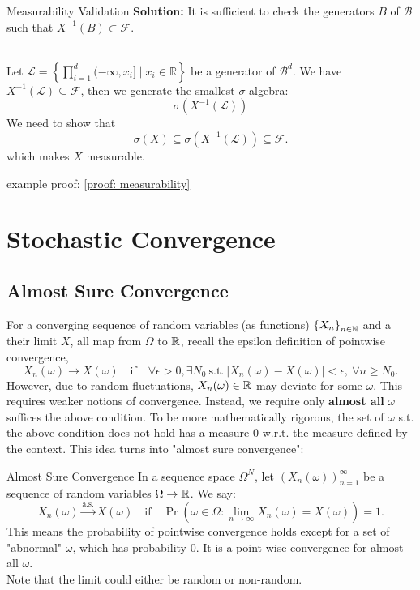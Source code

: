 \begin{thm}{Measurability Validation}
\textbf{Solution:} It is sufficient to check the generators \( B \) of $\mathscr{B}$ such that \( X^{-1}(B)\subset \mathscr{F}\).\\
\end{thm}

\begin{eg}\\
 Let \( \mathcal{L} = \left\{ \prod_{i=1}^d (-\infty, x_i] \mid x_i \in \mathbb{R} \right\} \) be a generator of \( \mathscr{B}^d \).
 We have \( X^{-1}(\mathcal{L}) \subseteq \mathscr{F} \), then we generate the smallest \( \sigma \)-algebra:
    \[
    \sigma(X^{-1}(\mathcal{L})) \]
We need to show that
   \[\sigma(X) \subseteq \sigma(X^{-1}(\mathcal{L})) \subseteq \mathscr{F}.
    \]
which makes \( X \) measurable.

\noindent example proof: \ref{proof: measurability}
\end{eg}

\newpage
\section{Stochastic Convergence}
\subsection{Almost Sure Convergence}
For a converging sequence of random variables (as functions) $\qty{X_n}_{n\in\mathbb{N}}$ and a their limit $X$, all map from $\Omega$ to ${\mathbb{R}}$, recall the epsilon definition of pointwise convergence,
\[
X_n(\omega) \to X(\omega) \quad \text{if} \quad \forall \epsilon > 0, \exists N_0 \ \text{s.t.} \ |X_n(\omega) - X(\omega)| < \epsilon, \ \forall n \geq N_0.
\]
However, due to random fluctuations, \(X_n(\omega)\in {\mathbb{R}}\) may deviate for some \(\omega\). This requires weaker notions of convergence. Instead, we require only \textbf{almost all} $\omega$ suffices the above condition. To be more mathematically rigorous, the set of $\omega$ s.t. the above condition does not hold has a measure 0 w.r.t. the measure defined by the context. This idea turns into "almost sure convergence": \\

\begin{thm}{Almost Sure Convergence}
In a sequence space \(\Omega^{N}\), let \((X_n(\omega))_{n=1}^\infty\) be a sequence of random variables $\Omega \rightarrow {\mathbb{R}}$. We say:
\[
X_n(\omega) \xrightarrow{\text{a.s.}} X(\omega) \quad \text{if} \quad \Pr\left(\omega\in \Omega: \lim_{n \to \infty} X_n(\omega) = X(\omega)\right) = 1.
\]
This means the probability of pointwise convergence holds except for a set of "abnormal" \(\omega\), which has probability 0. It is a point-wise convergence for almost all $\omega$. \\

\noindent Note that the limit could either be random or non-random.
\end{thm}

